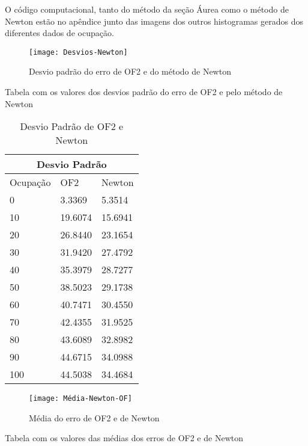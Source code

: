 O código computacional, tanto do método da seção Áurea como o método de Newton estão no apêndice junto das imagens dos outros histogramas gerados dos diferentes dados de ocupação.

\begin{figure}[H]
    \centering
    \caption{Desvio padrão do erro de OF2 e do método de Newton}
    \texttt{[image: Desvios-Newton]}
    \label{OFeNewton}
\end{figure}

Tabela com os valores dos desvios padrão do erro de OF2 e pelo método de Newton\\



\begin{table}[htb]
\centering
\ABNTEXfontereduzida
\caption[Desvio Padrão de OF2 e Newton]{Desvio Padrão de OF2 e Newton}
\label{desvio-padrão-newton}
\begin{tabular}{ |p{3cm}|p{3cm}|p{3cm}|  }
\hline
\multicolumn{3}{|c|}{Desvio Padrão} \\
\hline
Ocupação & OF2 & Newton\\
\hline
0 & 3.3369 & 5.3514 \\
10 &  19.6074 & 15.6941 \\
20 &  26.8440 & 23.1654 \\
30 &  31.9420 & 27.4792 \\
40 &  35.3979 & 28.7277 \\
50 &  38.5023 & 29.1738 \\
60 &  40.7471 & 30.4550 \\
70 &  42.4355 & 31.9525 \\
80 &  43.6089 & 32.8982 \\
90 &  44.6715 & 34.0988 \\
100 &  44.5038 & 34.4684 \\
\hline
\end{tabular}
\end{table}
\newline
\newline



\begin{figure}[H]
    \centering
    \caption{Média do erro de OF2 e de Newton}
    \texttt{[image: Média-Newton-OF]}
    \label{OFeNewton}
\end{figure}

Tabela com os valores das médias dos erros de OF2 e de Newton\\

